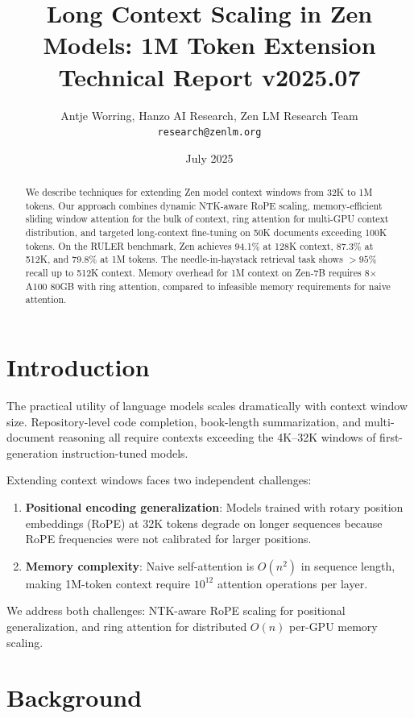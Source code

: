 \documentclass[11pt,a4paper]{article}
\title{\textbf{Long Context Scaling in Zen Models: 1M Token Extension}\\
\large Technical Report v2025.07}
\author{Antje Worring, Hanzo AI Research, Zen LM Research Team\\
\texttt{research@zenlm.org}}
\date{July 2025}
\begin{document}
\maketitle

\begin{abstract}
We describe techniques for extending Zen model context windows from 32K to 1M tokens.
Our approach combines dynamic NTK-aware RoPE scaling, memory-efficient sliding window
attention for the bulk of context, ring attention for multi-GPU context distribution,
and targeted long-context fine-tuning on 50K documents exceeding 100K tokens. On
the RULER benchmark, Zen achieves 94.1\% at 128K context, 87.3\% at 512K, and
79.8\% at 1M tokens. The needle-in-haystack retrieval task shows $>95\%$ recall
up to 512K context. Memory overhead for 1M context on Zen-7B requires 8$\times$A100
80GB with ring attention, compared to infeasible memory requirements for naive attention.
\end{abstract}

\section{Introduction}

The practical utility of language models scales dramatically with context window size.
Repository-level code completion, book-length summarization, and multi-document
reasoning all require contexts exceeding the 4K--32K windows of first-generation
instruction-tuned models.

Extending context windows faces two independent challenges:
\begin{enumerate}
  \item \textbf{Positional encoding generalization}: Models trained with rotary position
    embeddings (RoPE) at 32K tokens degrade on longer sequences because RoPE frequencies
    were not calibrated for larger positions.
  \item \textbf{Memory complexity}: Naive self-attention is $O(n^2)$ in sequence length,
    making 1M-token context require $10^{12}$ attention operations per layer.
\end{enumerate}

We address both challenges: NTK-aware RoPE scaling for positional generalization,
and ring attention for distributed $O(n)$ per-GPU memory scaling.

\section{Background}
\end{document}
